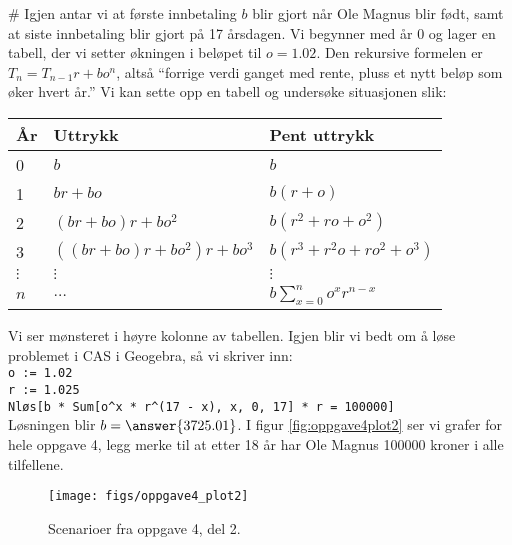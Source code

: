 \begin{easylist}[enumerate]
	# Igjen antar vi at første innbetaling $b$ blir gjort når Ole Magnus blir født, samt at siste innbetaling blir gjort på 17 årsdagen.
	Vi begynner med år 0 og lager en tabell, der vi setter økningen i beløpet til $o = 1.02$.
	Den rekursive formelen er $T_n = T_{n-1}r + bo^n$, altså ``forrige verdi ganget med rente, pluss et nytt beløp som øker hvert år.''
	Vi kan sette opp en tabell og undersøke situasjonen slik:
	\begin{center}
		\begin{tabular}{l|l|l}
			\textbf{År} & \textbf{Uttrykk} & \textbf{Pent uttrykk} \\ \hline
			0 & $b$ & $b$ \\
			1 & $br + bo$ & $b(r+o)$ \\
			2 & $\left(br + bo\right)r + bo^2$ & $b(r^2 + ro + o^2)$ \\
			3 & $\left( \left(br + bo\right)r + bo^2 \right)r + bo^3$ & $b(r^3 + r^2o + ro^2 + o^3)$ \\
			$\vdots$ & $\vdots$ & $\vdots$ \\
			$n$ & $\dots$ & $b \sum_{x = 0}^{n} o^x r^{n-x}$
		\end{tabular}
	\end{center}
	Vi ser mønsteret i høyre kolonne av tabellen.
	Igjen blir vi bedt om å løse problemet i CAS i Geogebra, så vi skriver inn: \\
	\texttt{o := 1.02} \\
	\texttt{r := 1.025} \\
	\texttt{Nløs[b * Sum[o\textasciicircum x * r\textasciicircum(17 - x), x, 0, 17] * r = 100000]} \\
	Løsningen blir $b = \answer{3725.01}$. I figur \eqref{fig:oppgave4plot2} ser vi grafer for hele oppgave 4, legg merke til at etter 18 år har Ole Magnus 100000 kroner i alle tilfellene. 
	\begin{figure}[th!]
		\centering
		\texttt{[image: figs/oppgave4\_plot2]}
		\caption{Scenarioer fra oppgave 4, del 2.}
		\label{fig:oppgave4plot2}
	\end{figure}
\end{easylist}







